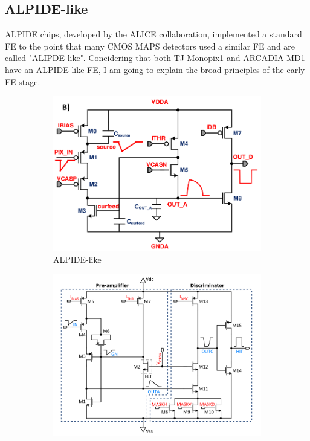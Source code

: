     \subsection{ALPIDE-like}
        ALPIDE chips, developed by the ALICE collaboration, implemented a standard FE to the point that many CMOS MAPS detectors used a similar FE and are called "ALIPDE-like". 
        Concidering that both TJ-Monopix1 and ARCADIA-MD1 have an ALPIDE-like FE, I am going to explain the broad principles of the early FE stage. 
        \begin{figure}[h!]
            \begin{subfigure}{.5\textwidth}
            \centering
            \includegraphics[width=.98\linewidth]{figures/Monopix1/ALPIDE_FE.png}
            \caption{ALPIDE-like}
            \label{fig:ALPIDE-like}
            \end{subfigure}
            \begin{subfigure}{.5\textwidth}
            \centering
            \includegraphics[width=.98\linewidth]{figures/Monopix1/Monopix1_FE_circuit.png}
            \caption{}
            \label{fig:Monopix1_FE_circuit}
            \end{subfigure}
        \end{figure}
